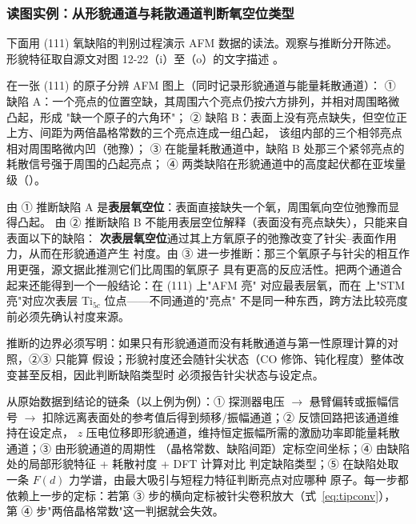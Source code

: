 \subsubsection{读图实例：从形貌通道与耗散通道判断氧空位类型}

下面用 (111) 氧缺陷的判别过程演示 AFM 数据的读法。观察与推断分开陈述。
形貌特征取自源文对图 12-22（i）至（o）的文字描述
。

\begin{obs}
在一张 (111) 的原子分辨 AFM 图上（同时记录形貌通道与能量耗散通道）：
① 缺陷 A：一个亮点的位置空缺，其周围六个亮点仍按六方排列，并相对周围略微凸起，形成
"缺一个原子的六角环"；
② 缺陷 B：表面上没有亮点缺失，但空位正上方、间距为两倍晶格常数的三个亮点连成一组凸起，
该组内部的三个相邻亮点相对周围略微内凹（弛豫）；
③ 在能量耗散通道中，缺陷 B 处那三个紧邻亮点的耗散信号强于周围的凸起亮点；
④ 两类缺陷在形貌通道中的高度起伏都在亚埃量级（）。
\end{obs}

\begin{infer}
由 ① 推断缺陷 A 是\textbf{表层氧空位}：表面直接缺失一个氧，周围氧向空位弛豫而显得凸起。
由 ② 推断缺陷 B 不能用表层空位解释（表面没有亮点缺失），只能来自表面以下的缺陷：
\textbf{次表层氧空位}通过其上方氧原子的弛豫改变了针尖--表面作用力，从而在形貌通道产生
衬度。由 ③ 进一步推断：那三个氧原子与针尖的相互作用更强，源文据此推测它们比周围的氧原子
具有更高的反应活性。把两个通道合起来还能得到一个一般结论：在 (111) 上"AFM 亮"
对应最表层氧，而在  上"STM 亮"对应次表层 Ti$_{5c}$ 位点——不同通道的"亮点"
不是同一种东西，跨方法比较亮度前必须先确认衬度来源。
\end{infer}

推断的边界必须写明：如果只有形貌通道而没有耗散通道与第一性原理计算的对照，②③ 只能算
假设；形貌衬度还会随针尖状态（CO 修饰、钝化程度）整体改变甚至反相，因此判断缺陷类型时
必须报告针尖状态与设定点。

\begin{dataflow}
从原始数据到结论的链条（以上例为例）：① 探测器电压 $\rightarrow$ 悬臂偏转或振幅信号
$\rightarrow$ 扣除远离表面处的参考值后得到频移/振幅通道；② 反馈回路把该通道维持在设定点，
$z$ 压电位移即形貌通道，维持恒定振幅所需的激励功率即能量耗散通道；③ 由形貌通道的周期性
（晶格常数、缺陷间距）定标空间坐标；④ 由缺陷处的局部形貌特征 + 耗散衬度 + DFT 计算对比
判定缺陷类型；⑤ 在缺陷处取一条 $F(d)$ 力学谱，由最大吸引与短程力特征判断亮点对应哪种
原子。每一步都依赖上一步的定标：若第 ③ 步的横向定标被针尖卷积放大（式~\eqref{eq:tipconv}），
第 ④ 步"两倍晶格常数"这一判据就会失效。
\end{dataflow}

